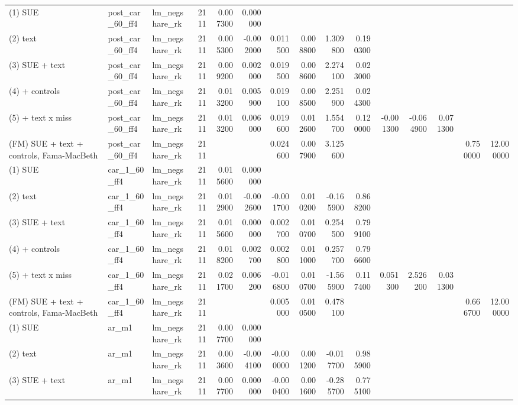 \begin{table}
\begin{tabular}{lllrrrrrrrrrrrr}
(1) SUE & post\_car\_60\_ff4 & lm\_negshare\_rk & 2111 & 0.007300 & 0.000000 &  &  &  &  &  &  &  &  &  \\
(2) text & post\_car\_60\_ff4 & lm\_negshare\_rk & 2111 & 0.005300 & -0.002000 & 0.011500 & 0.008800 & 1.309800 & 0.190300 &  &  &  &  &  \\
(3) SUE + text & post\_car\_60\_ff4 & lm\_negshare\_rk & 2111 & 0.009200 & 0.002000 & 0.019500 & 0.008600 & 2.274100 & 0.023000 &  &  &  &  &  \\
(4) + controls & post\_car\_60\_ff4 & lm\_negshare\_rk & 2111 & 0.013200 & 0.005900 & 0.019100 & 0.008500 & 2.251900 & 0.024300 &  &  &  &  &  \\
(5) + text x miss & post\_car\_60\_ff4 & lm\_negshare\_rk & 2111 & 0.013200 & 0.006000 & 0.019600 & 0.012600 & 1.554700 & 0.120000 & -0.001300 & -0.064900 & 0.071300 &  &  \\
(FM) SUE + text + controls, Fama-MacBeth & post\_car\_60\_ff4 & lm\_negshare\_rk & 2111 &  &  & 0.024600 & 0.007900 & 3.125600 &  &  &  &  & 0.750000 & 12.000000 \\
(1) SUE & car\_1\_60\_ff4 & lm\_negshare\_rk & 2111 & 0.015600 & 0.000000 &  &  &  &  &  &  &  &  &  \\
(2) text & car\_1\_60\_ff4 & lm\_negshare\_rk & 2111 & 0.012900 & -0.002600 & -0.001700 & 0.010200 & -0.165900 & 0.868200 &  &  &  &  &  \\
(3) SUE + text & car\_1\_60\_ff4 & lm\_negshare\_rk & 2111 & 0.015600 & 0.000000 & 0.002700 & 0.010700 & 0.254500 & 0.799100 &  &  &  &  &  \\
(4) + controls & car\_1\_60\_ff4 & lm\_negshare\_rk & 2111 & 0.018200 & 0.002700 & 0.002800 & 0.011000 & 0.257700 & 0.796600 &  &  &  &  &  \\
(5) + text x miss & car\_1\_60\_ff4 & lm\_negshare\_rk & 2111 & 0.021700 & 0.006200 & -0.016800 & 0.010700 & -1.565900 & 0.117400 & 0.051300 & 2.526200 & 0.031300 &  &  \\
(FM) SUE + text + controls, Fama-MacBeth & car\_1\_60\_ff4 & lm\_negshare\_rk & 2111 &  &  & 0.005000 & 0.010500 & 0.478100 &  &  &  &  & 0.666700 & 12.000000 \\
(1) SUE & ar\_m1 & lm\_negshare\_rk & 2111 & 0.007700 & 0.000000 &  &  &  &  &  &  &  &  &  \\
(2) text & ar\_m1 & lm\_negshare\_rk & 2111 & 0.003600 & -0.004100 & -0.000000 & 0.001200 & -0.017700 & 0.985900 &  &  &  &  &  \\
(3) SUE + text & ar\_m1 & lm\_negshare\_rk & 2111 & 0.007700 & 0.000000 & -0.000400 & 0.001600 & -0.285700 & 0.775100 &  &  &  &  &  \\

\end{tabular}
\end{table}
